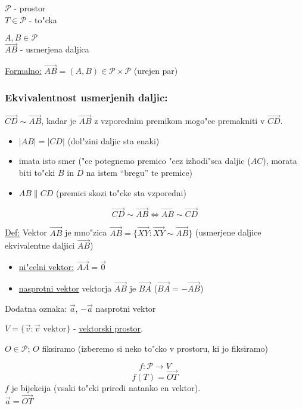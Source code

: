 \(\mathcal{P}\) - prostor\\
\(T \in \mathcal{P}\) - to"cka

\(A, B \in \mathcal{P}\)\\
\(\overrightarrow{AB}\) - usmerjena daljica

\underline{Formalno:} \(\overrightarrow{AB} = (A, B) \in \mathcal{P} \times \mathcal{P}\) (urejen par)

\subsubsection*{Ekvivalentnost usmerjenih daljic:}

\(\overrightarrow{CD} \sim \overrightarrow{AB}\), kadar je \(\overrightarrow{AB}\) z vzporednim premikom mogo"ce premakniti v \(\overrightarrow{CD}\).
\begin{itemize}
	\item \(|AB| = |CD|\) (dol"zini daljic sta enaki)
	\item imata isto smer ("ce potegnemo premico "cez izhodi"sca daljic (\(AC\)), morata biti to"cki \(B\) in \(D\) na istem ``bregu'' te premice)
	\item \(AB \parallel CD\) (premici skozi to"cke sta vzporedni)
\end{itemize}
\[\overrightarrow{CD} \sim \overrightarrow{AB} \iff \overrightarrow{AB} \sim \overrightarrow{CD}\]

\underline{Def:} Vektor \(\vec{AB}\) je mno"zica \(\vec{AB} = \{\overrightarrow{XY}: \overrightarrow{XY} \sim \overrightarrow{AB}\}\) (usmerjene daljice ekvivalentne daljici \(\overrightarrow{AB}\))

\begin{itemize}
	\item \underline{ni"celni vektor:} \(\vec{AA} = \vec{0}\)
	\item \underline{nasprotni vektor} vektorja \(\vec{AB}\) je \(\vec{BA}\) (\(\vec{BA} = -\vec{AB}\))
\end{itemize}

Dodatna oznaka: \(\vec{a}\), \(-\vec{a}\) nasprotni vektor

\(V = \{\vec{v}: \vec{v} \text{ vektor} \}\) - \underline{vektorski prostor}.

\(O \in \mathcal{P}\); \(O\) fiksiramo (izberemo si neko to"cko v prostoru, ki jo fiksiramo)

\[f: \mathcal{P} \rightarrow V\]
\[f(T) = \vec{OT}\]
\(f\) je bijekcija (vsaki to"cki priredi natanko en vektor).\\
\(\vec{a} = \vec{OT}\)


